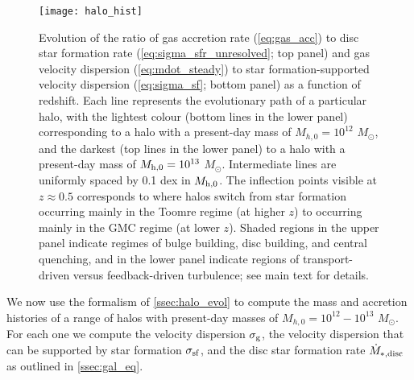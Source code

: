 \documentclass[useAMS,usenatbib]{mn2e}
\begin{document}
\begin{figure}
\texttt{[image: halo\_hist]}
\caption{
\label{fig:halo_hist}
Evolution of the ratio of gas accretion rate (\autoref{eq:gas_acc}) to disc star formation rate (\autoref{eq:sigma_sfr_unresolved}; top panel) and gas velocity dispersion (\autoref{eq:mdot_steady}) to star formation-supported velocity dispersion (\autoref{eq:sigma_sf}; bottom panel) as a function of redshift. Each line represents the evolutionary path of a particular halo, with the lightest colour (bottom lines in the lower panel) corresponding to a halo with a present-day mass of $M_{h,0} = 10^{12}$ $M_\odot$, and the darkest (top lines in the lower panel) to a halo with a present-day mass of $M_{\rm h,0} = 10^{13}$ $M_\odot$. Intermediate lines are uniformly spaced by 0.1 dex in $M_{\rm h,0}$. The inflection points visible at $z \approx 0.5$ corresponds to where halos switch from star formation occurring mainly in the Toomre regime (at higher $z$) to occurring mainly in the GMC regime (at lower $z$). Shaded regions in the upper panel indicate regimes of bulge building, disc building, and central quenching, and in the lower panel indicate regions of transport-driven versus feedback-driven turbulence; see main text for details.
}
\end{figure}

We now use the formalism of \autoref{ssec:halo_evol} to compute the mass and accretion histories of a range of halos with present-day masses of $M_{h,0} = 10^{12} - 10^{13}$ $M_\odot$. For each one we compute the velocity dispersion $\sigma_{\rm g}$, the velocity dispersion that can be supported by star formation $\sigma_{\rm sf}$, and the disc star formation rate $\dot{M}_{*, \rm disc}$ as outlined in \autoref{ssec:gal_eq}. 
\end{document}
